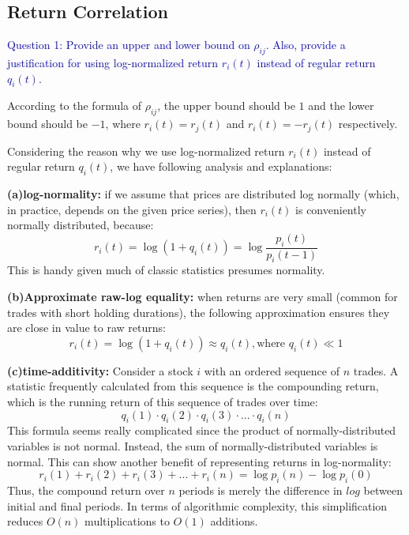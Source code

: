 \documentclass[11pt]{article}
\begin{document}
\subsection{Return Correlation}
\textcolor{blue}{Question 1: Provide an upper and lower bound on $\rho_{ij}$. Also, provide a justification for using log-normalized return $r_i(t)$ instead of regular return $q_i(t)$.}

According to the formula of $\rho_{ij}$, the upper bound should be $1$ and the lower bound should be $-1$, where $r_i(t) = r_j(t)$ and $r_i(t) = -r_j(t)$ respectively.

Considering the reason why we use log-normalized return $r_i(t)$ instead of regular return $q_i(t)$, we have following analysis and explanations:

\textbf{(a)log-normality:} if we assume that prices are distributed log normally (which, in practice, depends on the given price series), then $r_i(t)$ is conveniently normally distributed, because:
\begin{displaymath}r_i(t) = \log(1 + q_i(t)) = \log\frac{p_i(t)}{p_i(t-1)}\end{displaymath}
This is handy given much of classic statistics presumes normality.

\textbf{(b)Approximate raw-log equality:} when returns are very small (common for trades with short holding durations), the following approximation ensures they are close in value to raw returns:
\begin{displaymath}r_i(t) = \log(1 + q_i(t)) \approx q_i(t), \text{where } q_i(t)\ll 1\end{displaymath}

\textbf{(c)time-additivity:} Consider a stock $i$ with an ordered sequence of $n$ trades. A statistic frequently calculated from this sequence is the compounding return, which is the running return of this sequence of trades over time:
\begin{displaymath}q_i(1) \cdot q_i(2) \cdot q_i(3) \cdot...\cdot q_i(n)\end{displaymath}
This formula seems really complicated since the product of normally-distributed variables is not normal. Instead, the sum of normally-distributed variables is normal. This can show another benefit of representing returns in log-normality:
\begin{displaymath}r_i(1) + r_i(2) + r_i(3) + ... + r_i(n) =\log p_i(n) - \log p_i(0)\end{displaymath}
Thus, the compound return over $n$ periods is merely the difference in $log$ between initial and final periods. In terms of algorithmic complexity, this simplification reduces $O(n)$ multiplications to $O(1)$ additions. 
\end{document}
